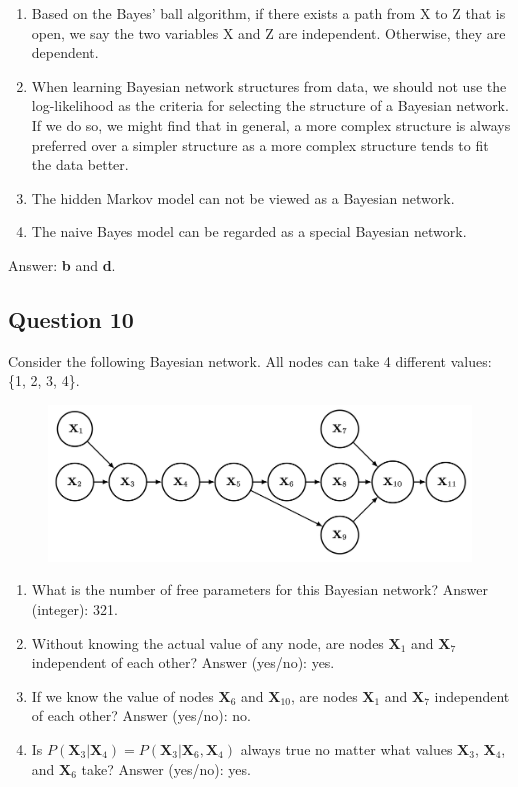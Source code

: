 \documentclass[11pt,fancychapters]{article}
\begin{document}
\begin{enumerate}[label=\textbf{\alph*.}]
	\item Based on the Bayes' ball algorithm, if there exists a path from X to Z that is open, we say the two variables X and Z are independent. Otherwise, they are dependent.
	\item When learning Bayesian network structures from data, we should not use the log-likelihood as the criteria for selecting the structure of a Bayesian network. If we do so, we might find that in general, a more complex structure is always preferred over a simpler structure as a more complex structure tends to fit the data better.
	\item The hidden Markov model can not be viewed as a Bayesian network.
	\item The naive Bayes model can be regarded as a special Bayesian network.
\end{enumerate}

Answer: \textbf{b} and \textbf{d}.

\subsection*{Question 10 {\normalfont{[12 points]}}}

Consider the following Bayesian network. All nodes can take 4 different values: \{1, 2, 3, 4\}.

\begin{figure}[h!]
	\centering
	\includegraphics[scale=.17]{BN(a)1.png}
\end{figure}

\begin{enumerate}[label=\textbf{\alph*.}]
	\item What is the number of free parameters for this Bayesian network? Answer (integer): 321.
	\item Without knowing the actual value of any node, are nodes $\textbf{X}_1$ and $\textbf{X}_7$ independent of each other? Answer (yes/no): yes.
	\item If we know the value of nodes $\textbf{X}_6$ and $\textbf{X}_{10}$, are nodes $\textbf{X}_1$ and $\textbf{X}_7$ independent of each other? Answer (yes/no): no.
	\item Is $P(\textbf{X}_3 | \textbf{X}_4) = P(\textbf{X}_3 | \textbf{X}_6, \textbf{X}_4)$ always true no matter what values $\textbf{X}_3$, $\textbf{X}_4$, and $\textbf{X}_6$ take? Answer (yes/no): yes.
\end{enumerate}
\end{document}
